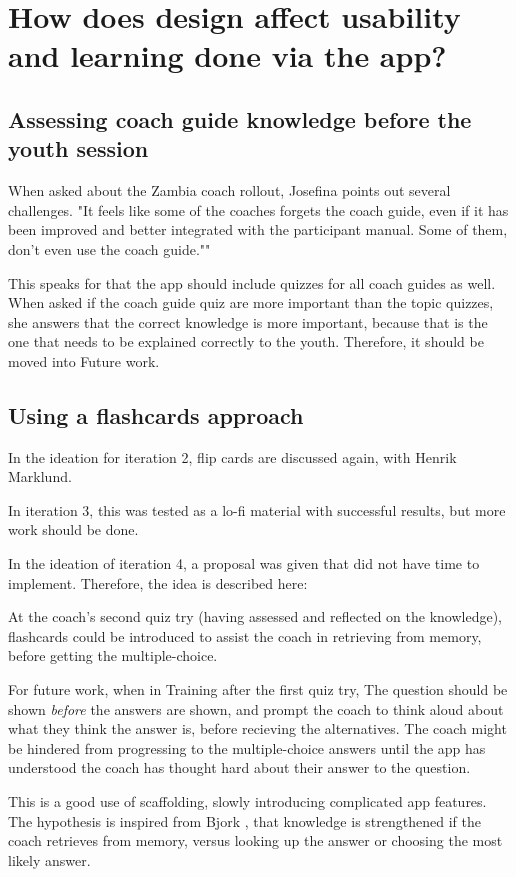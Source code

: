 \section{How does design affect usability and learning done via the app?}

\subsection{Assessing coach guide knowledge before the youth session}
When asked about the Zambia coach rollout, Josefina points out several challenges. "It feels like some of the coaches forgets the coach guide, even if it has been improved and better integrated with the participant manual. Some of them, don't even use the coach guide.""

This speaks for that the app should include quizzes for all coach guides as well. When asked if the coach guide quiz are more important than the topic quizzes, she answers that the correct knowledge is more important, because that is the one that needs to be explained correctly to the youth. Therefore, it should be moved into Future work.

\subsection{Using a flashcards approach}
In the ideation for iteration 2, flip cards are discussed again, with Henrik Marklund.

In iteration 3, this was tested as a lo-fi material with successful results, but more work should be done.

In the ideation of iteration 4, a proposal was given that did not have time to implement. Therefore, the idea is described here:

At the coach's second quiz try (having assessed and reflected on the knowledge), flashcards could be introduced to assist the coach in retrieving from memory, before getting the multiple-choice.

For future work, when in Training after the first quiz try, The question should be shown \textit{before} the answers are shown, and prompt the coach to think aloud about what they think the answer is, before recieving the alternatives. The coach might be hindered from progressing to the multiple-choice answers until the app has understood the coach has thought hard about their answer to the question.

This is a good use of scaffolding, slowly introducing complicated app features. The hypothesis is inspired from Bjork \cite{bjork}, that knowledge is strengthened if the coach retrieves from memory, versus looking up the answer or choosing the most likely answer.

